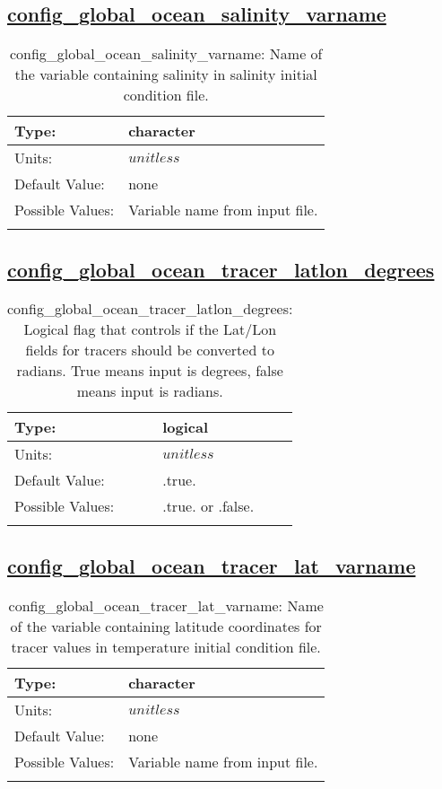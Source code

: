 \subsection[config\_global\_ocean\_salinity\_varname]{\hyperref[sec:nm_tab_global_ocean]{config\_global\_ocean\_salinity\_varname}}
\label{subsec:nm_sec_config_global_ocean_salinity_varname}
\begin{center}
\begin{longtable}{| p{2.0in} || p{4.0in} |}
    \hline
    Type: & character \\
    \hline
    Units: & $unitless$ \\
    \hline
    Default Value: & none \\
    \hline
    Possible Values: & Variable name from input file. \\
    \hline
    \caption{config\_global\_ocean\_salinity\_varname: Name of the variable containing salinity in salinity initial condition file.}
\end{longtable}
\end{center}
\subsection[config\_global\_ocean\_tracer\_latlon\_degrees]{\hyperref[sec:nm_tab_global_ocean]{config\_global\_ocean\_tracer\_latlon\_degrees}}
\label{subsec:nm_sec_config_global_ocean_tracer_latlon_degrees}
\begin{center}
\begin{longtable}{| p{2.0in} || p{4.0in} |}
    \hline
    Type: & logical \\
    \hline
    Units: & $unitless$ \\
    \hline
    Default Value: & .true. \\
    \hline
    Possible Values: & .true. or .false. \\
    \hline
    \caption{config\_global\_ocean\_tracer\_latlon\_degrees: Logical flag that controls if the Lat/Lon fields for tracers should be converted to radians. True means input is degrees, false means input is radians.}
\end{longtable}
\end{center}
\subsection[config\_global\_ocean\_tracer\_lat\_varname]{\hyperref[sec:nm_tab_global_ocean]{config\_global\_ocean\_tracer\_lat\_varname}}
\label{subsec:nm_sec_config_global_ocean_tracer_lat_varname}
\begin{center}
\begin{longtable}{| p{2.0in} || p{4.0in} |}
    \hline
    Type: & character \\
    \hline
    Units: & $unitless$ \\
    \hline
    Default Value: & none \\
    \hline
    Possible Values: & Variable name from input file. \\
    \hline
    \caption{config\_global\_ocean\_tracer\_lat\_varname: Name of the variable containing latitude coordinates for tracer values in temperature initial condition file.}
\end{longtable}
\end{center}
